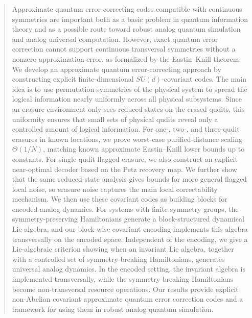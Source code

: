 \documentclass[10pt,twocolumn,superscriptaddress,aps,amsmath,amssymb,citeautoscript,floatfix,prx,longbibliography]{revtex4-2}
\newcounter{alg}
\theoremstyle{plain}
\theoremstyle{plain}
\theoremstyle{plain}
\theoremstyle{plain}
\theoremstyle{plain}
\theoremstyle{plain}
\begin{document}
\begin{abstract}
Approximate quantum error-correcting codes compatible with continuous symmetries are important both as a basic problem in quantum information theory and as a possible route toward robust analog quantum simulation and analog universal computation. However, exact quantum error correction cannot support continuous transversal symmetries without a nonzero approximation error, as formalized by the Eastin--Knill theorem. We develop an approximate quantum error-correcting approach by constructing explicit finite-dimensional \(SU(d)\)-covariant codes. The main idea is to use permutation symmetries of the physical system to spread the logical information nearly uniformly across all physical subsystems. Since an erasure environment only sees reduced states on the erased qudits, this uniformity ensures that small sets of physical qudits reveal only a controlled amount of logical information. For one-, two-, and three-qudit erasures in known locations, we prove worst-case purified-distance scaling \(\Theta(1/N)\), matching known approximate Eastin--Knill lower bounds up to constants. For single-qudit flagged erasure, we also construct an explicit near-optimal decoder based on the Petz recovery map. We further show that the same reduced-state analysis gives bounds for more general flagged local noise, so erasure noise captures the main local correctability mechanism. We then use these covariant codes as building blocks for encoded analog dynamics. For systems with finite symmetry groups, the symmetry-preserving Hamiltonians generate a block-structured dynamical Lie algebra, and our block-wise covariant encoding implements this algebra transversally on the encoded space. Independent of the encoding, we give a Lie-algebraic criterion showing when an invariant Lie algebra, together with a controlled set of symmetry-breaking Hamiltonians, generates universal analog dynamics. In the encoded setting, the invariant algebra is implemented transversally, while the symmetry-breaking Hamiltonians become non-transversal resource operations. Our results provide explicit non-Abelian covariant approximate quantum error correction codes and a framework for using them in robust analog quantum simulation.


\end{abstract}
\end{document}
